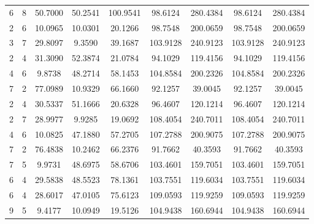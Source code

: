 \documentclass[withoutpreface,bwprint]{cumcmthesis} %
\begin{document}
\begin{appendices}
\begin{table}[htbp!]
\begin{tabular}{@{}ccccccccc@{}}
								6              & 8              & 50.7000     & 50.2541     & 100.9541    & 98.6124         & 280.4384        & 98.6124         & 280.4384        \\
								2              & 6              & 10.0965     & 10.0301     & 20.1266     & 98.7548         & 200.0659        & 98.7548         & 200.0659        \\
								3              & 7              & 29.8097     & 9.3590      & 39.1687     & 103.9128        & 240.9123        & 103.9128        & 240.9123        \\
								2              & 4              & 31.3090     & 52.3874     & 21.0784     & 94.1029         & 119.4156        & 94.1029         & 119.4156        \\
								4              & 6              & 9.8738      & 48.2714     & 58.1453     & 104.8584        & 200.2326        & 104.8584        & 200.2326        \\
								7              & 2              & 77.0989     & 10.9329     & 66.1660     & 92.1257         & 39.0045         & 92.1257         & 39.0045         \\
								2              & 4              & 30.5337     & 51.1666     & 20.6328     & 96.4607         & 120.1214        & 96.4607         & 120.1214        \\
								2              & 7              & 28.9977     & 9.9285      & 19.0692     & 108.4054        & 240.7011        & 108.4054        & 240.7011        \\
								4              & 6              & 10.0825     & 47.1880     & 57.2705     & 107.2788        & 200.9075        & 107.2788        & 200.9075        \\
								7              & 2              & 76.4838     & 10.2462     & 66.2376     & 91.7662         & 40.3593         & 91.7662         & 40.3593         \\
								7              & 5              & 9.9731      & 48.6975     & 58.6706     & 103.4601        & 159.7051        & 103.4601        & 159.7051        \\
								6              & 4              & 29.5838     & 48.5523     & 78.1361     & 103.7551        & 119.6034        & 103.7551        & 119.6034        \\
								6              & 4              & 28.6017     & 47.0105     & 75.6123     & 109.0593        & 119.9259        & 109.0593        & 119.9259        \\
								9              & 5              & 9.4177      & 10.0949     & 19.5126     & 104.9438        & 160.6944        & 104.9438        & 160.6944        \\

\end{tabular}
\end{table}
\end{appendices}
\end{document}
